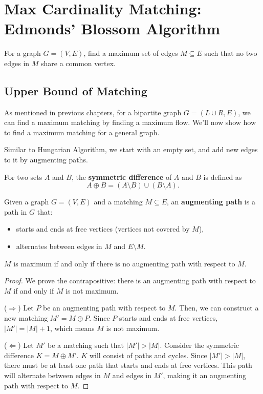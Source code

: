\chapter{Max Cardinality Matching: Edmonds' Blossom Algorithm}

\begin{problem}
For a graph $G = (V, E)$, find a maximum set of edges $M\subseteq E$ such that no two edges in $M$ share a common vertex.
\end{problem}

\section{Upper Bound of Matching}

As mentioned in previous chapters, for a bipartite graph $G = (L \cup R, E)$, we can find a maximum matching by finding a maximum flow. We'll now show how to find a maximum matching for a general graph.

Similar to Hungarian Algorithm, we start with an empty set, and add new edges to it by augmenting paths.

\begin{definition}
	For two sets $A$ and $B$, the \textbf{symmetric difference} of $A$ and $B$ is defined as
	\[
		A \oplus B = (A \setminus B) \cup (B \setminus A).
	\]
\end{definition}
\begin{definition}
	Given a graph $G = (V, E)$ and a matching $M \subseteq E$, an \textbf{augmenting path} is a path in $G$ that:
	\begin{itemize}
		\item starts and ends at free vertices (vertices not covered by $M$),
		\item alternates between edges in $M$ and $E\setminus M$.
	\end{itemize}
\end{definition}

\begin{theorem}
	$M$ is maximum if and only if there is no augmenting path with respect to $M$.
\end{theorem}
\begin{proof}
	We prove the contrapositive: there is an augmenting path with respect to $M$ if and only if $M$ is not maximum.

	($\Rightarrow$) Let $P$ be an augmenting path with respect to $M$. Then, we can construct a new matching $M' = M \oplus P$. Since $P$ starts and ends at free vertices, $|M'| = |M| + 1$, which means $M$ is not maximum.

	($\Leftarrow$) Let $M'$ be a matching such that $|M'| > |M|$. Consider the symmetric difference $K = M \oplus M'$.
	$K$ will consist of paths and cycles. Since $|M'| > |M|$, there must be at least one path that starts and ends at free vertices. This path will alternate between edges in $M$ and edges in $M'$, making it an augmenting path with respect to $M$.
\end{proof}

